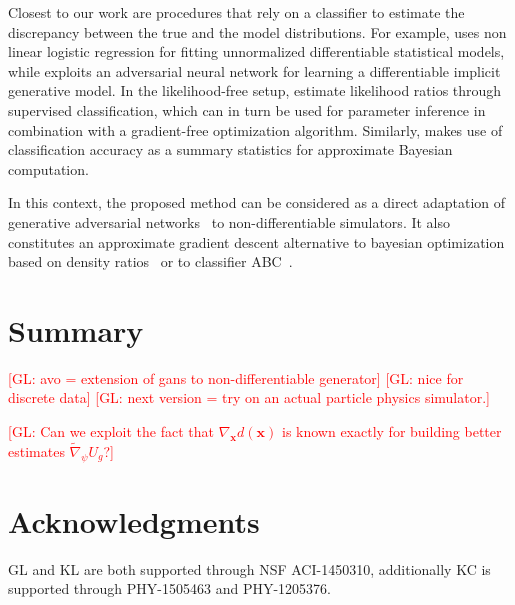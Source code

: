 \documentclass[twocolumn,superscriptaddress,aps]{revtex4-1}
\newcommand{\glnote}[1]{\textcolor{red}{[GL: #1]}}
\theoremstyle{plain}
\begin{document}
Closest to our work are procedures that rely on a classifier to estimate the
discrepancy between the true and the model distributions. For example,
\citep{gutmann2012noise} uses non linear logistic regression for fitting
unnormalized differentiable statistical models, while
\citep{goodfellow2014generative} exploits an adversarial neural network for
learning a differentiable implicit generative model. In the likelihood-free
setup, \citep{cranmer2015approximating,2016arXiv161110242D} estimate likelihood
ratios through supervised classification, which can in turn be used for
parameter inference in combination with a gradient-free optimization algorithm.
Similarly, \citep{gutmann2017likelihood} makes use of classification accuracy as
a summary statistics for approximate Bayesian computation.

In this context, the proposed method can be considered as a direct adaptation of
generative adversarial networks~\citep{goodfellow2014generative} to
non-differentiable simulators. It also constitutes an approximate gradient
descent alternative to bayesian optimization based on density
ratios~\citep{cranmer2015approximating} or to classifier
ABC~\citep{gutmann2017likelihood}.



\section{Summary}

\glnote{avo = extension of gans to non-differentiable generator}
\glnote{nice for discrete data}
\glnote{next version = try on an actual particle physics simulator.}

\glnote{Can we exploit the fact that $\nabla_\mathbf{x} d(\mathbf{x})$
is known exactly for building better estimates $\tilde{\nabla}_\psi U_g$?}


\section*{Acknowledgments}

GL and KL are both supported through NSF ACI-1450310, additionally KC is
supported through PHY-1505463 and PHY-1205376.





\end{document}
